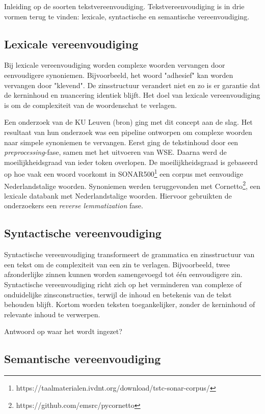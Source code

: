 Inleiding op de soorten tekstvereenvoudiging. Tekstvereenvoudiging is in drie vormen terug te vinden: lexicale, syntactische en semantische vereenvoudiging.

\subsection{Lexicale vereenvoudiging}

Bij lexicale vereenvoudiging worden complexe woorden vervangen door eenvoudigere synoniemen. Bijvoorbeeld, het woord "adhesief" kan worden vervangen door "klevend". De zinsstructuur verandert niet en zo is er garantie dat de kerninhoud en nuancering identiek blijft. Het doel van lexicale vereenvoudiging is om de complexiteit van de woordenschat te verlagen.

Een onderzoek van de KU Leuven (bron) ging met dit concept aan de slag. Het resultaat van hun onderzoek was een pipeline ontworpen om complexe woorden naar simpele synoniemen te vervangen. Eerst ging de tekstinhoud door een \textit{preprocessing}-fase, samen met het uitvoeren van WSE. Daarna werd de moeilijkheidsgraad van ieder token overlopen. De moeilijkheidsgraad is gebaseerd op hoe vaak een woord voorkomt in SONAR500\footnote{https://taalmaterialen.ivdnt.org/download/tstc-sonar-corpus/} een corpus met eenvoudige Nederlandstalige woorden. Synoniemen werden teruggevonden met Cornetto\footnote{https://github.com/emsrc/pycornetto}, een lexicale databank met Nederlandstalige woorden. Hiervoor gebruikten de onderzoekers een \textit{reverse lemmatization} fase.

\subsection{Syntactische vereenvoudiging}

Syntactische vereenvoudiging transformeert de grammatica en zinsstructuur van een tekst om de complexiteit van een zin te verlagen. Bijvoorbeeld, twee afzonderlijke zinnen kunnen worden samengevoegd tot één eenvoudigere zin. Syntactische vereenvoudiging richt zich op het verminderen van complexe of onduidelijke zinsconstructies, terwijl de inhoud en betekenis van de tekst behouden blijft. Kortom worden teksten toegankelijker, zonder de kerninhoud of relevante inhoud te verwerpen.

Antwoord op waar het wordt ingezet?

\subsection{Semantische vereenvoudiging}

